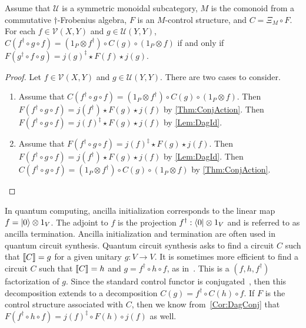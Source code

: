 \begin{cor}
    \label{Cor:DagConj}
    Assume that $\mathcal{U}$ is a symmetric monoidal subcategory, $M$ is the comonoid from a commutative $\dagger$-Frobenius algebra, $F$ is an $M$-control structure, and $C = \Xi_M \circ F$.
    For each $f \in \mathcal{V}( X, Y )$ and $g \in \mathcal{U}( Y, Y )$, $C( f^\dagger \circ g \circ f ) = ( 1_P \otimes f^\dagger ) \circ C( g ) \circ ( 1_P \otimes f )$ if and only if $F( g^\dagger \circ f \circ g ) = j( g )^\ddagger \star F( f ) \star j( g )$.
\end{cor}

\begin{proof}
    Let $f \in \mathcal{V}( X, Y )$ and $g \in \mathcal{U}( Y, Y )$.
    There are two cases to consider.
    \begin{enumerate}[align=left]
    \item[$\Rightarrow$]
          Assume that $C( f^\dagger \circ g \circ f ) = ( 1_P \otimes f^\dagger ) \circ C( g ) \circ ( 1_P \otimes f )$.
          Then $F( f^\dagger \circ g \circ f ) = j( f^\dagger ) \star F( g ) \star j( f )$ by \cref{Thm:ConjAction}.
          Then $F( f^\dagger \circ g \circ f ) = j( f )^\ddagger \star F( g ) \star j( f )$ by \cref{Lem:DagId}.
    \item[$\Leftarrow$]
          Assume that $F( f^\dagger \circ g \circ f ) = j( f )^\ddagger \star F( g ) \star j( f )$.
          Then $F( f^\dagger \circ g \circ f ) = j( f^\dagger ) \star F( g ) \star j( f )$ by \cref{Lem:DagId}.
          Then $C( f^\dagger \circ g \circ f ) = ( 1_P \otimes f^\dagger ) \circ C( g ) \circ ( 1_P \otimes f )$ by \cref{Thm:ConjAction}.
          \endproof
    \end{enumerate}
\end{proof}

\begin{exa}
    In quantum computing, ancilla initialization corresponds to the linear map $f = \ket{0} \otimes 1_V$.
    The adjoint to $f$ is the projection $f^\dagger: \bra{0} \otimes 1_V$ and is referred to as ancilla termination.
    Ancilla initialization and termination are often used in quantum circuit synthesis.
    Quantum circuit synthesis asks to find a circuit $C$ such that $\llbracket C\rrbracket = g$ for a given unitary $g: V \to V$.
    It is sometimes more efficient to find a circuit $C$ such that $\llbracket C\rrbracket = h$ and $g = f^\dagger \circ h \circ f$, as in~\cite{Barenco_1995}.
    This is a $( f, h, f^\dagger )$ factorization of $g$.
    Since the standard control functor is conjugated~\cite{Delorme2026}, then this decomposition extends to a decomposition $C( g ) = f^\dagger \circ C( h ) \circ f$.
    If $F$ is the control structure associated with $C$, then we know from~\cref{Cor:DagConj} that $F( f^\dagger \circ h \circ f ) = j( f )^\ddagger \circ F( h ) \circ j( f )$ as well.
\end{exa}
